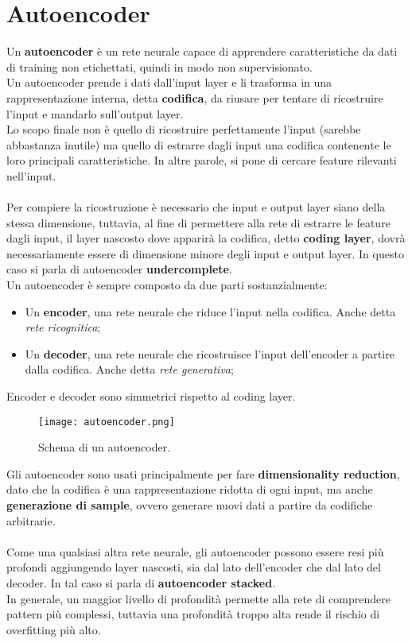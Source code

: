 \section{Autoencoder}
Un \textbf{autoencoder} è un rete neurale capace di apprendere caratteristiche da dati di training non etichettati, quindi in modo non supervisionato.\\
Un autoencoder prende i dati dall'input layer e li trasforma in una rappresentazione interna, detta \textbf{codifica}, da riusare per tentare di ricostruire l'input e mandarlo sull'output layer.\\
Lo scopo finale non è quello di ricostruire perfettamente l'input (sarebbe abbastanza inutile) ma quello di estrarre dagli input una codifica contenente le loro principali caratteristiche. In altre parole, si pone di cercare feature rilevanti nell'input.\\
\\
Per compiere la ricostruzione è necessario che input e output layer siano della stessa dimensione, tuttavia, al fine di permettere alla rete di estrarre le feature dagli input, il layer nascosto dove apparirà la codifica, detto \textbf{coding layer}, dovrà necessariamente essere di dimensione minore degli input e output layer. In questo caso si parla di autoencoder \textbf{undercomplete}.\\
Un autoencoder è sempre composto da due parti sostanzialmente:
\begin{itemize}
	\item Un \textbf{encoder}, una rete neurale che riduce l'input nella codifica. Anche detta \textit{rete ricognitica};
	\item Un \textbf{decoder}, una rete neurale che ricostruisce l'input dell'encoder a partire dalla codifica. Anche detta \textit{rete generativa};
\end{itemize}
Encoder e decoder sono simmetrici rispetto al coding layer.
\begin{figure}[H]
	\centering
	\texttt{[image: autoencoder.png]}
	\caption{Schema di un autoencoder.}
	\label{fig:autoencoder}
\end{figure}
Gli autoencoder sono usati principalmente per fare \textbf{dimensionality reduction}, dato che la codifica è una rappresentazione ridotta di ogni input, ma anche \textbf{generazione di sample}, ovvero generare nuovi dati a partire da codifiche arbitrarie.\\
\\
Come una qualsiasi altra rete neurale, gli autoencoder possono essere resi più profondi aggiungendo layer nascosti, sia dal lato dell'encoder che dal lato del decoder. In tal caso si parla di \textbf{autoencoder stacked}.\\
In generale, un maggior livello di profondità permette alla rete di comprendere pattern più complessi, tuttavia una profondità troppo alta rende il rischio di overfitting più alto.


